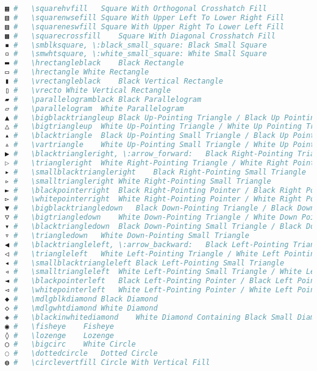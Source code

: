 \begin{lstlisting}[language=Julia, style=julia, linewidth=\textwidth]
▦ #   \squarehvfill   Square With Orthogonal Crosshatch Fill
▧ #   \squarenwsefill Square With Upper Left To Lower Right Fill
▨ #   \squareneswfill Square With Upper Right To Lower Left Fill
▩ #   \squarecrossfill    Square With Diagonal Crosshatch Fill
▪ #   \smblksquare, \:black_small_square: Black Small Square
▫ #   \smwhtsquare, \:white_small_square: White Small Square
▬ #   \hrectangleblack    Black Rectangle
▭ #   \hrectangle White Rectangle
▮ #   \vrectangleblack    Black Vertical Rectangle
▯ #   \vrecto White Vertical Rectangle
▰ #   \parallelogramblack Black Parallelogram
▱ #   \parallelogram  White Parallelogram
▲ #   \bigblacktriangleup Black Up-Pointing Triangle / Black Up Pointing Triangle
△ #   \bigtriangleup  White Up-Pointing Triangle / White Up Pointing Triangle
▴ #   \blacktriangle  Black Up-Pointing Small Triangle / Black Up Pointing Small Triangle
▵ #   \vartriangle    White Up-Pointing Small Triangle / White Up Pointing Small Triangle
▶ #   \blacktriangleright, \:arrow_forward:   Black Right-Pointing Triangle / Black Right Pointing Triangle
▷ #   \triangleright  White Right-Pointing Triangle / White Right Pointing Triangle
▸ #   \smallblacktriangleright    Black Right-Pointing Small Triangle
▹ #   \smalltriangleright White Right-Pointing Small Triangle
► #   \blackpointerright  Black Right-Pointing Pointer / Black Right Pointing Pointer
▻ #   \whitepointerright  White Right-Pointing Pointer / White Right Pointing Pointer
▼ #   \bigblacktriangledown   Black Down-Pointing Triangle / Black Down Pointing Triangle
▽ #   \bigtriangledown    White Down-Pointing Triangle / White Down Pointing Triangle
▾ #   \blacktriangledown  Black Down-Pointing Small Triangle / Black Down Pointing Small Triangle
▿ #   \triangledown   White Down-Pointing Small Triangle
◀ #   \blacktriangleleft, \:arrow_backward:   Black Left-Pointing Triangle / Black Left Pointing Triangle
◁ #   \triangleleft   White Left-Pointing Triangle / White Left Pointing Triangle
◂ #   \smallblacktriangleleft Black Left-Pointing Small Triangle
◃ #   \smalltriangleleft  White Left-Pointing Small Triangle / White Left Pointing Small Triangle
◄ #   \blackpointerleft   Black Left-Pointing Pointer / Black Left Pointing Pointer
◅ #   \whitepointerleft   White Left-Pointing Pointer / White Left Pointing Pointer
◆ #   \mdlgblkdiamond Black Diamond
◇ #   \mdlgwhtdiamond White Diamond
◈ #   \blackinwhitediamond    White Diamond Containing Black Small Diamond
◉ #   \fisheye    Fisheye
◊ #   \lozenge    Lozenge
○ #   \bigcirc    White Circle
◌ #   \dottedcircle   Dotted Circle
◍ #   \circlevertfill Circle With Vertical Fill

\end{lstlisting}
